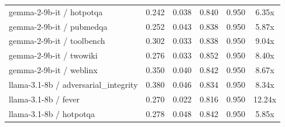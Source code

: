 \begin{table}[h]
\begin{tabular}{l|cc|cc|c}
gemma-2-9b-it / hotpotqa & 0.242 & 0.038 & 0.840 & 0.950 & 6.35x \\
gemma-2-9b-it / pubmedqa & 0.252 & 0.043 & 0.838 & 0.950 & 5.87x \\
gemma-2-9b-it / toolbench & 0.302 & 0.033 & 0.838 & 0.950 & 9.04x \\
gemma-2-9b-it / twowiki & 0.276 & 0.033 & 0.852 & 0.950 & 8.40x \\
gemma-2-9b-it / weblinx & 0.350 & 0.040 & 0.842 & 0.950 & 8.67x \\
llama-3.1-8b / adversarial_integrity & 0.380 & 0.046 & 0.834 & 0.950 & 8.34x \\
llama-3.1-8b / fever & 0.270 & 0.022 & 0.816 & 0.950 & 12.24x \\
llama-3.1-8b / hotpotqa & 0.278 & 0.048 & 0.842 & 0.950 & 5.85x \\
\hline
\end{tabular}
\end{table}
